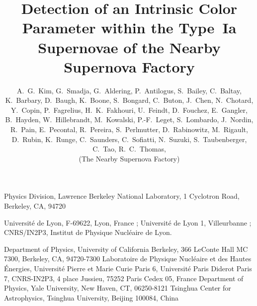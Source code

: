 \documentclass{aastex}   	%
\begin{document}
\title{Detection of an Intrinsic Color Parameter within the Type~Ia Supernovae of the Nearby Supernova Factory}
\author
{
    A.~G.~Kim,
    G.~Smadja, 
    G.~Aldering,
    P.~Antilogus,
    S.~Bailey,
    C.~Baltay,
    K.~Barbary,
    D.~Baugh,
    K.~Boone,
    S.~Bongard,
    C.~Buton,
    J.~Chen,
    N.~Chotard,
    Y.~Copin,
    P.~Fagrelius,
    H.~K.~Fakhouri,
    U.~Feindt,
    D.~Fouchez,
    E.~Gangler,  
    B.~Hayden,
    W.~Hillebrandt,
    M.~Kowalski,
    P.-F.~Leget,
    S.~Lombardo,
    J.~Nordin,
    R.~Pain, 
    E.~Pecontal,
    R.~Pereira,
    S.~Perlmutter,
    D.~Rabinowitz,
    M.~Rigault, 
    D.~Rubin,
    K.~Runge,
    C.~Saunders,
    C.~Sofiatti, 
    N.~Suzuki,
    S.~Taubenberger,
    C.~Tao,
    R.~C.~Thomas, \\
    (The Nearby Supernova Factory)
}


{
    Physics Division, Lawrence Berkeley National Laboratory, 
    1 Cyclotron Road, Berkeley, CA, 94720
}

{
    Universit\'e de Lyon, F-69622, Lyon, France ; Universit\'e de Lyon 1, Villeurbanne ; 
    CNRS/IN2P3, Institut de Physique Nucl\'eaire de Lyon.
}

{
    Department of Physics, University of California Berkeley,
    366 LeConte Hall MC 7300, Berkeley, CA, 94720-7300
}
{
    Laboratoire de Physique Nucl\'eaire et des Hautes \'Energies,
    Universit\'e Pierre et Marie Curie Paris 6, Universit\'e Paris Diderot Paris 7, CNRS-IN2P3, 
    4 place Jussieu, 75252 Paris Cedex 05, France
}
{
    Department of Physics, Yale University, 
    New Haven, CT, 06250-8121
}
{
    Tsinghua Center for Astrophysics, Tsinghua University, Beijing 100084, China 
}
\end{document}
